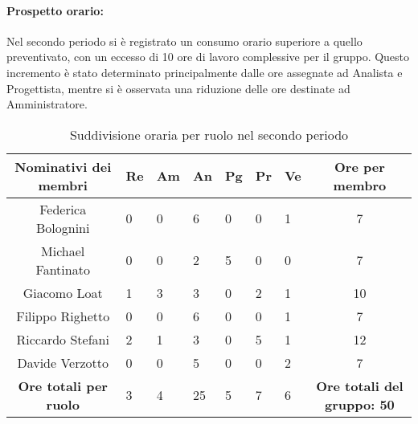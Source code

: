\paragraph{Prospetto orario: }
Nel secondo periodo si è registrato un consumo orario superiore a quello preventivato, con un eccesso di 10 ore di lavoro complessive per il gruppo. Questo incremento è stato determinato principalmente dalle ore assegnate ad Analista e Progettista, mentre si è osservata una riduzione delle ore destinate ad Amministratore.
\begin{table}[h!]
    \centering
    \renewcommand{\arraystretch}{1.5}
    \begin{tabularx}{\textwidth}{|c|X|X|X|X|X|X|c|}\hline
    \rowcolor[HTML]{FFD700} 
    \textbf{Nominativi dei membri} & \textbf{Re} & \textbf{Am} & \textbf{An} & \textbf{Pg} & \textbf{Pr} & \textbf{Ve} & \textbf{Ore per membro} \\ \hline
    Federica Bolognini & 0 & 0 & 6 & 0 & 0 & 1 & 7  \\ \hline
    Michael Fantinato  & 0 & 0 & 2 & 5 & 0 & 0 & 7  \\ \hline
    Giacomo Loat       & 1 & 3 & 3 & 0 & 2 & 1 & 10 \\ \hline
    Filippo Righetto   & 0 & 0 & 6 & 0 & 0 & 1 & 7  \\ \hline
    Riccardo Stefani   & 2 & 1 & 3 & 0 & 5 & 1 & 12 \\ \hline
    Davide Verzotto    & 0 & 0 & 5 & 0 & 0 & 2 & 7  \\ \hline
    \rowcolor[HTML]{FFD700} 
    \textbf{Ore totali per ruolo} & 3 & 4 & 25 & 5 & 7 & 6 & \textbf{Ore totali del gruppo: 50} \\ \hline
    \end{tabularx}
    \caption{Suddivisione oraria per ruolo nel secondo periodo}
\end{table}

